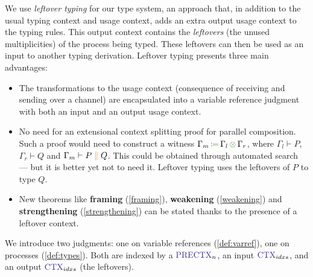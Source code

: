 \documentclass[a4paper,UKenglish,cleveref,autoref,thm-restate,authorcolumns]{lipics-v2019}
\theoremstyle{definition}
\newcommand{\type}[1]{\textcolor{BlueViolet}{\operatorname{#1}}}
\newcommand{\constr}[1]{\textcolor{BurntOrange}{\operatorname{#1}}}
\newcommand{\func}[1]{\textcolor{OliveGreen}{\operatorname{#1}}}
\newcommand{\comp}[2]{#1 \; \constr{\parallel} \; #2}
\newcommand{\opctx}[3]{#1 \, \func{\coloneqq} \, #2 \, \func{\otimes} \, #3}
\newcommand{\PreCtx}{\type{PRECTX}}
\newcommand{\Ctx}{\type{CTX}}
\begin{document}
We use \emph{leftover typing} \cite{Allais2018a} for our type system, an approach that, in addition to the usual typing context and usage context, adds an extra output usage context to the typing rules.
This output context contains the \emph{leftovers} (the unused multiplicities) of the process being typed.
These leftovers can then be used as an input to another typing derivation.
Leftover typing presents three main advantages:
\begin{itemize}
  \item
    The transformations to the usage context (consequence of receiving and sending over a channel) are encapsulated into a variable reference judgment with both an input and an output usage context.
  \item
    No need for an extensional context splitting proof for parallel composition.
    Such a proof would need to construct a witness $\opctx{\Gamma_m}{\Gamma_l}{\Gamma_r}$, where $\Gamma_l \vdash P$, $\Gamma_r \vdash Q$ and $\Gamma_m \vdash \comp{P}{Q}$.
    This could be obtained through automated search --- but it is better yet not to need it.
    Leftover typing uses the leftovers of $P$ to type $Q$.
  \item
    New theorems like \textbf{framing} (\autoref{framing}), \textbf{weakening} (\autoref{weakening}) and \textbf{strengthening} (\autoref{strengthening}) can be stated thanks to the presence of a leftover context.
\end{itemize}
  
We introduce two judgments: one on variable references (\autoref{def:varref}), one on processes (\autoref{def:types}).
Both are indexed by a $\PreCtx_n$, an input $\Ctx_{idxs}$, and an output $\Ctx_{idxs}$ (the leftovers).
\end{document}
